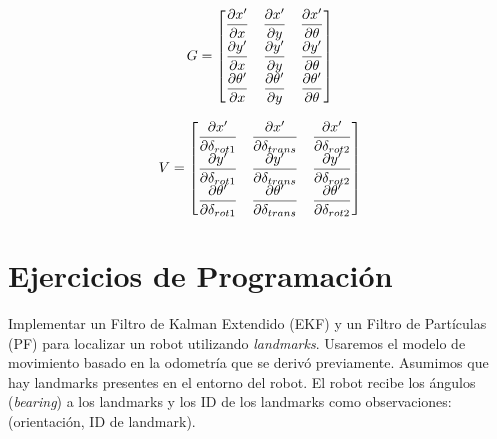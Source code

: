 \documentclass[tp]{lcc}
\begin{document}
    \noindent
    \begin{minipage}[t]{.5\textwidth}
    \begin{equation*}
        G =
        \begin{bmatrix}
            \dfrac{\partial x^{\prime}}{\partial x} & \dfrac{\partial x^{\prime}}{\partial y} & \dfrac{\partial x^{\prime}}{\partial \theta}\\
            \dfrac{\partial y^{\prime}}{\partial x} & \dfrac{\partial y^{\prime}}{\partial y} & \dfrac{\partial y^{\prime}}{\partial \theta}\\
            \dfrac{\partial \theta^{\prime}}{\partial x} & \dfrac{\partial \theta^{\prime}}{\partial y} & \dfrac{\partial \theta^{\prime}}{\partial \theta}
        \end{bmatrix}
\end{equation*}
    \end{minipage}%
    \begin{minipage}[t]{.5\textwidth}
        \begin{equation*}
            V =
            \begin{bmatrix}
                \dfrac{\partial x^{\prime}}{\partial \delta_{rot1}} & \dfrac{\partial x^{\prime}}{\partial \delta_{trans}} & \dfrac{\partial x^{\prime}}{\partial \delta_{rot2}}\\
                \dfrac{\partial y^{\prime}}{\partial \delta_{rot1}} & \dfrac{\partial y^{\prime}}{\partial \delta_{trans}} & \dfrac{\partial y^{\prime}}{\partial \delta_{rot2}}\\
                \dfrac{\partial \theta^{\prime}}{\partial \delta_{rot1}} & \dfrac{\partial \theta^{\prime}}{\partial \delta_{trans}} & \dfrac{\partial \theta^{\prime}}{\partial \delta_{rot2}}
            \end{bmatrix}
        \end{equation*}
    \end{minipage}
    
	
	\section{Ejercicios de Programación}
		
	Implementar un Filtro de Kalman Extendido (EKF) y un Filtro de Partículas (PF) para localizar un robot utilizando \emph{landmarks}. Usaremos el modelo de movimiento basado en la odometría que se derivó previamente. Asumimos que hay landmarks presentes en el entorno del robot. El robot recibe los ángulos (\emph{bearing}) a los landmarks y los ID de los landmarks como observaciones: (orientación, ID de landmark).
	
\end{document}
